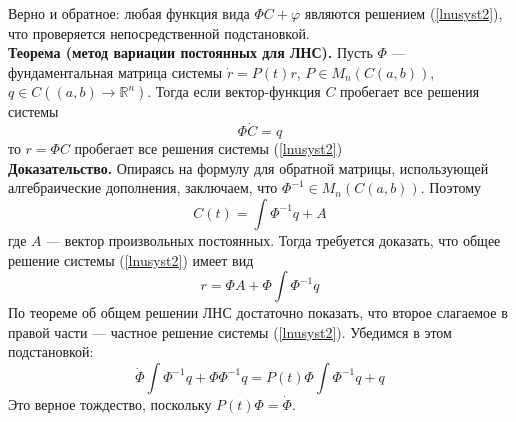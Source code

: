 \documentclass{article}
\begin{document}
Верно и обратное: любая функция вида $\Phi C + \varphi$ являются решением (\ref{lnusyst2}), что проверяется непосредственной подстановкой.\\

\noindent \textbf{Теорема (метод вариации постоянных для ЛНС).} Пусть $\Phi$ --- фундаментальная матрица системы $\dot{r} = P(t)r$, $P \in M_n(C(a,b))$, $q \in C((a,b) \to \mathbb{R}^n)$. Тогда если вектор-функция $C$ пробегает все решения системы
\begin{equation*}
    \Phi\dot{C} = q
\end{equation*}
то $r = \Phi C$ пробегает все решения системы (\ref{lnusyst2})\\

\noindent \textbf{Доказательство.} Опираясь на формулу для обратной матрицы, использующей алгебраические дополнения, заключаем, что $\Phi^{-1} \in M_n(C(a,b))$. Поэтому
\begin{equation*}
    C(t) = \int \Phi^{-1}q + A
\end{equation*}
где $A$ --- вектор произвольных постоянных. Тогда требуется доказать, что общее решение системы (\ref{lnusyst2}) имеет вид
\begin{equation*}
    r = \Phi A + \Phi \int \Phi^{-1}q
\end{equation*}
По теореме об общем решении ЛНС достаточно показать, что второе слагаемое в правой части --- частное решение системы (\ref{lnusyst2}). Убедимся в этом подстановкой:
\begin{equation*}
    \dot{\Phi}\int \Phi^{-1}q + \Phi\Phi^{-1}q = P(t)\Phi \int \Phi^{-1}q + q
\end{equation*}
Это верное тождество, поскольку $P(t)\Phi = \dot{\Phi}$.
\end{document}
